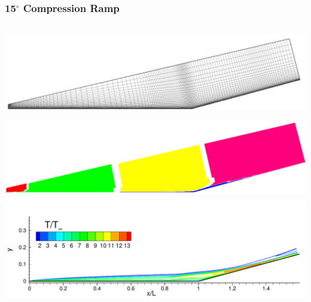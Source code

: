 \documentclass[compress,11pt]{beamer}
\begin{document}
\logo{}
\frame
{
  \frametitle{\scriptsize 15$^\circ$ Compression Ramp}
  \vspace{-2.4em}
  \begin{columns}[t]
      \begin{center}
	\includegraphics[width=\textwidth]{figures/holden_ramp/grid}
	
	\includegraphics[width=\textwidth]{figures/holden_ramp/partitioned}
	
	\includegraphics[width=\textwidth]{figures/holden_ramp/T}
	

\end{center}
\end{columns}}
\end{document}
